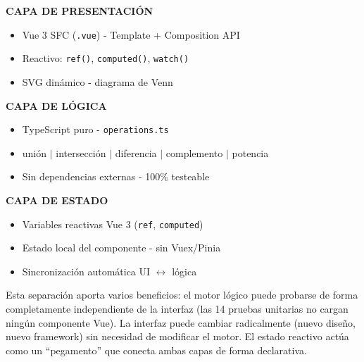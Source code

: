 \documentclass[11pt,a4paper]{article}
\begin{document}
\begin{center}
\begin{tcolorbox}[colback=white,colframe=bannerblue,width=0.92\textwidth,sharp corners]
\textbf{CAPA DE PRESENTACIÓN}
\begin{itemize}[noitemsep]
    \item Vue 3 SFC (\texttt{.vue}) - Template + Composition API
    \item Reactivo: \texttt{ref()}, \texttt{computed()}, \texttt{watch()}
    \item SVG dinámico - diagrama de Venn
\end{itemize}
\tcblower
\textbf{CAPA DE LÓGICA}
\begin{itemize}[noitemsep]
    \item TypeScript puro - \texttt{operations.ts}
    \item unión $\mid$ intersección $\mid$ diferencia $\mid$ complemento $\mid$ potencia
    \item Sin dependencias externas - 100\% testeable
\end{itemize}
\tcblower
\textbf{CAPA DE ESTADO}
\begin{itemize}[noitemsep]
    \item Variables reactivas Vue 3 (\texttt{ref}, \texttt{computed})
    \item Estado local del componente - sin Vuex/Pinia
    \item Sincronización automática UI $\longleftrightarrow$ lógica
\end{itemize}
\end{tcolorbox}
\end{center}

Esta separación aporta varios beneficios: el motor lógico puede probarse de forma completamente independiente de la interfaz (las 14 pruebas unitarias no cargan ningún componente Vue). La interfaz puede cambiar radicalmente (nuevo diseño, nuevo framework) sin necesidad de modificar el motor. El estado reactivo actúa como un ``pegamento'' que conecta ambas capas de forma declarativa.
\end{document}
